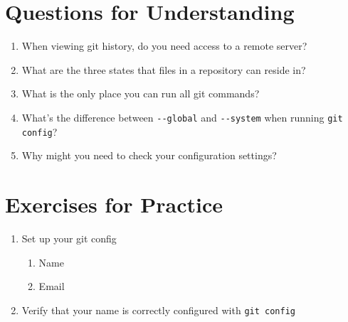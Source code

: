 \section{Questions for Understanding}
\begin{enumerate}
    \item When viewing git history, do you need access to a remote server?
    \item What are the three states that files in a repository can reside 
        in?
    \item What is the only place you can run all git commands?
    \item What's the difference between \verb+--global+ and \verb+--system+
        when running \verb+git config+?
    \item Why might you need to check your configuration settings?
\end{enumerate}

\section{Exercises for Practice}
\begin{enumerate}
    \item Set up your git config
        \begin{enumerate}
            \item Name
            \item Email
        \end{enumerate}
    \item Verify that your name is correctly configured with 
        \verb+git config+
\end{enumerate}
